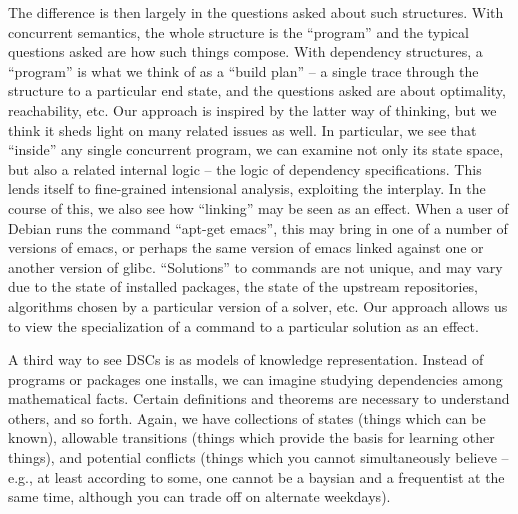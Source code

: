 \documentclass[hoptionsi,review,screen,format=acmsmall]{acmart}
\theoremstyle{definition}
\begin{document}
The difference is then largely in the questions asked about such structures. With concurrent semantics, the whole structure is the ``program'' and the typical questions asked are how such things compose. With dependency structures, a ``program'' is what we think of as a ``build plan'' -- a single trace through the structure to a particular end state, and the questions asked are about optimality, reachability, etc. Our approach is inspired by the latter way of thinking, but we think it sheds light on many related issues as well. In particular, we see that ``inside'' any single concurrent program, we can examine not only its state space, but also a related internal logic -- the logic of dependency specifications. This lends itself to fine-grained intensional analysis, exploiting the interplay. In the course of this, we also see how ``linking'' may be seen as an effect. When a user of Debian runs the command ``apt-get emacs'', this may bring in one of a number of versions of emacs, or perhaps the same version of emacs linked against one or another version of glibc. ``Solutions'' to commands are not unique, and may vary due to the state of installed packages, the state of the upstream repositories, algorithms chosen by a particular version of a solver, etc. Our approach allows us to view the specialization of a command to a particular solution as an effect.

A third way to see DSCs is as models of knowledge representation. Instead of programs or packages one installs, we can imagine studying dependencies among mathematical facts. Certain definitions and theorems are necessary to understand others, and so forth. Again, we have collections of states (things which can be known), allowable transitions (things which provide the basis for learning other things), and potential conflicts (things which you cannot simultaneously believe -- e.g., at least according to some, one cannot be a baysian and a frequentist at the same time, although you can trade off on alternate weekdays).
\end{document}
